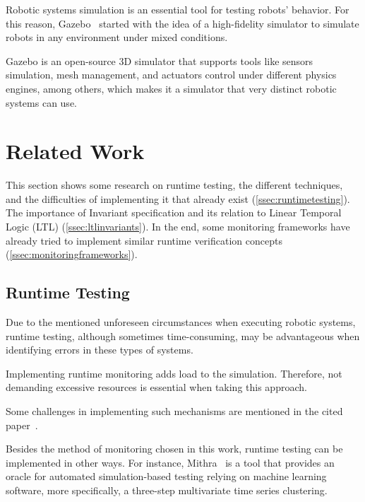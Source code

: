 Robotic systems simulation is an essential tool for testing robots' behavior. For this reason, Gazebo~\cite{koenig2004design} started with the idea of a high-fidelity simulator to simulate robots in any environment under mixed conditions.

Gazebo is an open-source 3D simulator that supports tools like sensors simulation, mesh management, and actuators control under different physics engines, among others, which makes it a simulator that very distinct robotic systems can use.


\section{Related Work}
\label{sec:relatedwork}

This section shows some research on runtime testing, the different techniques, and the difficulties of implementing it that already exist (\autoref{ssec:runtimetesting}). The importance of Invariant specification and its relation to Linear Temporal Logic (LTL) (\autoref{ssec:ltlinvariants}). In the end, some monitoring frameworks have already tried to implement similar runtime verification concepts (\autoref{ssec:monitoringframeworks}).


\subsection{Runtime Testing}
\label{ssec:runtimetesting}

Due to the mentioned unforeseen circumstances when executing robotic systems, runtime testing, although sometimes time-consuming, may be advantageous when identifying errors in these types of systems.

Implementing runtime monitoring adds load to the simulation. Therefore, not demanding excessive resources is essential when taking this approach.

Some challenges in implementing such mechanisms are mentioned in the cited paper~\cite{stadler2022towards}.

Besides the method of monitoring chosen in this work, runtime testing can be implemented in other ways. For instance, Mithra~\cite{AfzalMithra} is a tool that provides an oracle for automated simulation-based testing relying on machine learning software, more specifically, a three-step multivariate time series clustering.


